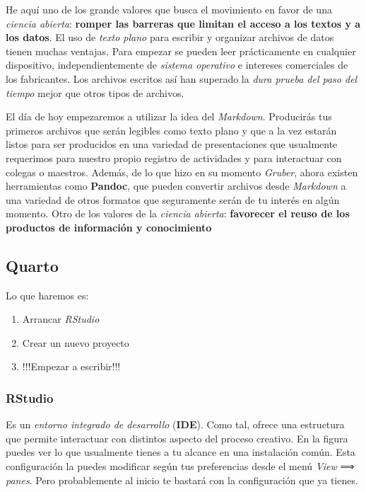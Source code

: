 \documentclass[
  spanish,
  letterpaper,
  DIV=11,
  numbers=noendperiod]{scrartcl}
\providecommand{\tightlist}{%
  \setlength{\itemsep}{0pt}\setlength{\parskip}{0pt}}
\begin{document}
He aquí uno de los grande valores que busca el movimiento en favor de
una \emph{ciencia abierta}: \textbf{romper las barreras que limitan el
acceso a los textos y a los datos}. El uso de \emph{texto plano} para
escribir y organizar archivos de datos tienen muchas ventajas. Para
empezar se pueden leer prácticamente en cualquier dispositivo,
independientemente de \emph{sistema operativo} e intereses comerciales
de los fabricantes. Los archivos escritos así han superado la \emph{dura
prueba del paso del tiempo} mejor que otros tipos de archivos.

El día de hoy empezaremos a utilizar la idea del \emph{Markdown}.
Producirás tus primeros archivos que serán legibles como texto plano y
que a la vez estarán listos para ser producidos en una variedad de
presentaciones que usualmente requerimos para nuestro propio registro de
actividades y para interactuar con colegas o maestros. Además, de lo que
hizo en su momento \emph{Gruber}, ahora existen herramientas como
\textbf{Pandoc}, que pueden convertir archivos desde \emph{Markdown} a
una variedad de otros formatos que seguramente serán de tu interés en
algún momento. Otro de los valores de la \emph{ciencia abierta}:
\textbf{favorecer el reuso de los productos de información y
conocimiento}

\subsection{Quarto}\label{quarto}

Lo que haremos es:

\begin{enumerate}
\def\labelenumi{\arabic{enumi}.}
\tightlist
\item
  Arrancar \emph{RStudio}
\item
  Crear un nuevo proyecto
\item
  {!!!Empezar a escribir!!!}
\end{enumerate}

\subsubsection{RStudio}\label{rstudio}

Es un \emph{entorno integrado de desarrollo} (\textbf{IDE}). Como tal,
ofrece una estructura que permite interactuar con distintos aspecto del
proceso creativo. En la figura puedes ver lo que usualmente tienes a tu
alcance en una instalación común. Esta configuración la puedes modificar
según tus preferencias desde el menú \emph{View} ⟹ \emph{panes}. Pero
probablemente al inicio te bastará con la configuración que ya tienes.
\end{document}
